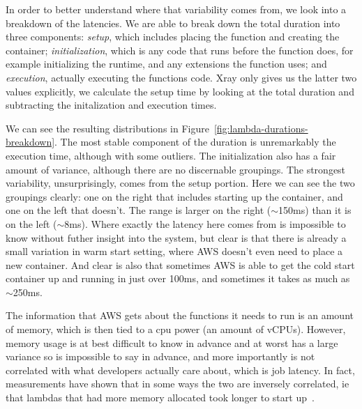 In order to better understand where that variability comes from, we look into a
breakdown of the latencies. We are able to break down the total duration into
three components: \textit{setup}, which includes placing the function and
creating the container; \textit{initialization}, which is any code that runs
before the function does, for example initializing the runtime, and any
extensions the function uses; and \textit{execution}, actually executing the
functions code. Xray only gives us the latter two values explicitly, we
calculate the setup time by looking at the total duration and subtracting the
initalization and execution times. 

We can see the resulting distributions in
Figure~\ref{fig:lambda-durations-breakdown}. The most stable component of the
duration is unremarkably the execution time, although with some outliers. The
initialization also has a fair amount of variance, although there are no
discernable groupings. The strongest variability, unsurprisingly, comes from the
setup portion. Here we can see the two groupings clearly: one on the right that
includes starting up the container, and one on the left that doesn't. The range
is larger on the right ($\sim$150ms) than it is on the left ($\sim$8ms). Where
exactly the latency here comes from is impossible to know without futher insight
into the system, but clear is that there is already a small variation in warm
start setting, where AWS doesn't even need to place a new container. And clear
is also that sometimes AWS is able to get the cold start container up and
running in just over 100ms, and sometimes it takes as much as $\sim$250ms. 



The information that AWS gets about the functions it needs to run is an amount
of memory, which is then tied to a cpu power (an amount of vCPUs). However,
memory usage is at best difficult to know in advance and at worst has a large
variance so is impossible to say in advance, and more importantly is not
correlated with what developers actually care about, which is job latency. In
fact, measurements have shown that in some ways the two are inversely
correlated, ie that lambdas that had more memory allocated took longer to start
up~\cite{cold-start-graphing}.  

